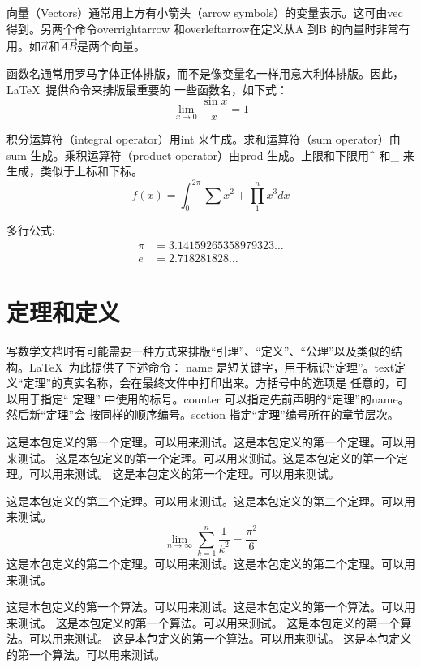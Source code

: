 向量（Vectors）通常用上方有小箭头（arrow symbols）的变量表示。这可由vec 得到。另两个命令overrightarrow 和overleftarrow在定义从A 到B 的向量时非常有用。如$\vec{a}$和$\overrightarrow{AB}$是两个向量。

函数名通常用罗马字体正体排版，而不是像变量名一样用意大利体排版。因此，\LaTeX{}~提供命令来排版最重要的
一些函数名，如下式：
\begin{equation}\label{eq:sin}
    \lim_{x \to 0} \frac{\sin x}{x} = 1
\end{equation}

积分运算符（integral operator）用int 来生成。求和运算符（sum operator）由sum 生成。乘积运算符（product operator）由prod 生成。上限和下限用\^{} 和\_ 来生成，类似于上标和下标。
\begin{equation}
    f(x) = \int_0^{2\pi}{\sum x^2 + \prod_1^n x^3}dx
\end{equation}

多行公式:
\begin{align}
 \pi&= 3.14159265358979323\ldots \\   
  e &= 2.718281828\ldots
\end{align}

\section{定理和定义}
写数学文档时有可能需要一种方式来排版“引理”、“定义”、“公理”以及类似的结构。\LaTeX{}~为此提供了下述命令：
name 是短关键字，用于标识“定理”。text定义“定理”的真实名称，会在最终文件中打印出来。方括号中的选项是
任意的，可以用于指定“ 定理” 中使用的标号。counter 可以指定先前声明的“定理”的name。然后新“定理”会
按同样的顺序编号。section 指定“定理”编号所在的章节层次。
\begin{thm}
这是本包定义的第一个定理。可以用来测试。这是本包定义的第一个定理。可以用来测试。
这是本包定义的第一个定理。可以用来测试。这是本包定义的第一个定理。可以用来测试。
这是本包定义的第一个定理。可以用来测试。
\end{thm}

\begin{thm}
这是本包定义的第二个定理。可以用来测试。这是本包定义的第二个定理。可以用来测试。
\begin{equation}
    \lim_{n \to \infty} \sum_{k=1}^n \frac{1}{k^2} = \frac{\pi^2}{6}
\end{equation}
这是本包定义的第二个定理。可以用来测试。这是本包定义的第二个定理。可以用来测试。
\end{thm}

\begin{algo}
这是本包定义的第一个算法。可以用来测试。这是本包定义的第一个算法。可以用来测试。
这是本包定义的第一个算法。可以用来测试。
这是本包定义的第一个算法。可以用来测试。
这是本包定义的第一个算法。可以用来测试。
这是本包定义的第一个算法。可以用来测试。

\end{algo}





